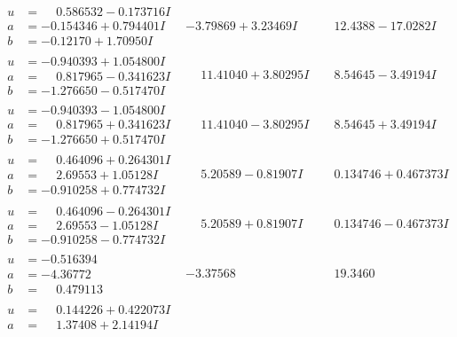 \documentclass[1p]{elsarticle_modified}
\theoremstyle{definition}
\begin{document}
$$\begin{array}{c|c|c}
\begin{aligned}
u &= \phantom{-}0.586532 - 0.173716 I \\
a &= -0.154346 + 0.794401 I \\
b &= -0.12170 + 1.70950 I\end{aligned}
 & -3.79869 + 3.23469 I & \phantom{-}12.4388 - 17.0282 I \\ \hline\begin{aligned}
u &= -0.940393 + 1.054800 I \\
a &= \phantom{-}0.817965 - 0.341623 I \\
b &= -1.276650 - 0.517470 I\end{aligned}
 & \phantom{-}11.41040 + 3.80295 I & \phantom{-}8.54645 - 3.49194 I \\ \hline\begin{aligned}
u &= -0.940393 - 1.054800 I \\
a &= \phantom{-}0.817965 + 0.341623 I \\
b &= -1.276650 + 0.517470 I\end{aligned}
 & \phantom{-}11.41040 - 3.80295 I & \phantom{-}8.54645 + 3.49194 I \\ \hline\begin{aligned}
u &= \phantom{-}0.464096 + 0.264301 I \\
a &= \phantom{-}2.69553 + 1.05128 I \\
b &= -0.910258 + 0.774732 I\end{aligned}
 & \phantom{-}5.20589 - 0.81907 I & \phantom{-}0.134746 + 0.467373 I \\ \hline\begin{aligned}
u &= \phantom{-}0.464096 - 0.264301 I \\
a &= \phantom{-}2.69553 - 1.05128 I \\
b &= -0.910258 - 0.774732 I\end{aligned}
 & \phantom{-}5.20589 + 0.81907 I & \phantom{-}0.134746 - 0.467373 I \\ \hline\begin{aligned}
u &= -0.516394\phantom{ +0.000000I} \\
a &= -4.36772\phantom{ +0.000000I} \\
b &= \phantom{-}0.479113\phantom{ +0.000000I}\end{aligned}
 & -3.37568\phantom{ +0.000000I} & \phantom{-}19.3460\phantom{ +0.000000I} \\ \hline\begin{aligned}
u &= \phantom{-}0.144226 + 0.422073 I \\
a &= \phantom{-}1.37408 + 2.14194 I \\

\end{aligned}
\end{array}$$
\end{document}
